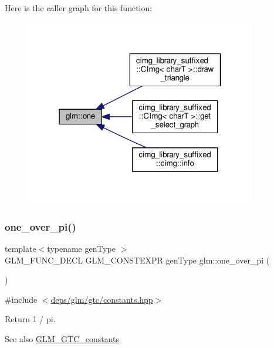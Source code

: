 Here is the caller graph for this function\+:
\nopagebreak
\begin{figure}[H]
\begin{center}
\leavevmode
\includegraphics[width=286pt]{d7/d6f/group__gtc__constants_ga39c2fb227631ca25894326529bdd1ee5_icgraph}
\end{center}
\end{figure}
\mbox{\label{group__gtc__constants_ga555150da2b06d23c8738981d5013e0eb}} 
\subsubsection{\texorpdfstring{one\+\_\+over\+\_\+pi()}{one\_over\_pi()}}
{\footnotesize\ttfamily template$<$typename gen\+Type $>$ \\
G\+L\+M\+\_\+\+F\+U\+N\+C\+\_\+\+D\+E\+CL G\+L\+M\+\_\+\+C\+O\+N\+S\+T\+E\+X\+PR gen\+Type glm\+::one\+\_\+over\+\_\+pi (\begin{DoxyParamCaption}{ }\end{DoxyParamCaption})}



{\ttfamily \#include $<$\hyperlink{constants_8hpp}{deps/glm/gtc/constants.\+hpp}$>$}

Return 1 / pi. \begin{DoxySeeAlso}{See also}
\hyperlink{group__gtc__constants}{G\+L\+M\+\_\+\+G\+T\+C\+\_\+constants} 
\end{DoxySeeAlso}


